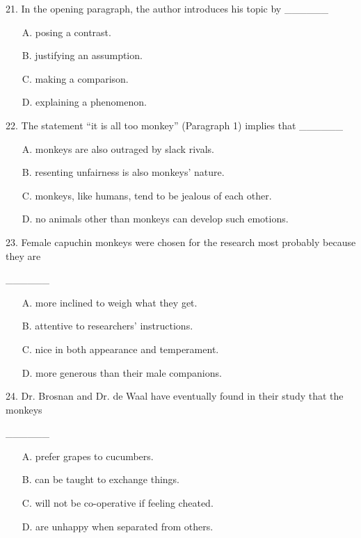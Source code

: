 \documentclass[UTF8,11pt]{ctexart}
\begin{document}
21. In the opening paragraph, the author introduces his topic by \_\_\_\_\_\_


\begin{itemize}[leftmargin=2em,itemsep=.2em,topsep=.4em]\item[A.] posing a contrast.
\item[B.] justifying an assumption.
\item[C.] making a comparison.
\item[D.] explaining a phenomenon.
\end{itemize}

22. The statement “it is all too monkey” (Paragraph 1) implies that \_\_\_\_\_\_


\begin{itemize}[leftmargin=2em,itemsep=.2em,topsep=.4em]\item[A.] monkeys are also outraged by slack rivals.
\item[B.] resenting unfairness is also monkeys’ nature.
\item[C.] monkeys, like humans, tend to be jealous of each other.
\item[D.] no animals other than monkeys can develop such emotions.
\end{itemize}

23. Female capuchin monkeys were chosen for the research most probably because they are


\_\_\_\_\_\_


\begin{itemize}[leftmargin=2em,itemsep=.2em,topsep=.4em]\item[A.] more inclined to weigh what they get.
\item[B.] attentive to researchers’ instructions.
\item[C.] nice in both appearance and temperament.
\item[D.] more generous than their male companions.
\end{itemize}

24. Dr. Brosnan and Dr. de Waal have eventually found in their study that the monkeys


\_\_\_\_\_\_


\begin{itemize}[leftmargin=2em,itemsep=.2em,topsep=.4em]\item[A.] prefer grapes to cucumbers.
\item[B.] can be taught to exchange things.
\item[C.] will not be co-operative if feeling cheated.
\item[D.] are unhappy when separated from others.
\end{itemize}
\end{document}
